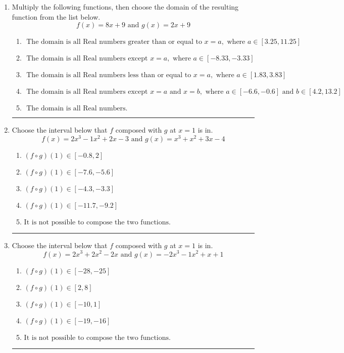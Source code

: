 \documentclass[14pt]{extbook}
\newcommand{\litem}[1]{\item#1\hspace*{-1cm}\rule{\textwidth}{0.4pt}}
\begin{document}
\begin{enumerate}
{\begin{enumerate}[label=\Alph*.]
\end{enumerate} }
\litem{
Multiply the following functions, then choose the domain of the resulting function from the list below.\[ f(x) = 8x + 9 \text{ and } g(x) = 2x + 9 \]\begin{enumerate}[label=\Alph*.]
\item \( \text{ The domain is all Real numbers greater than or equal to } x = a, \text{ where } a \in [3.25, 11.25] \)
\item \( \text{ The domain is all Real numbers except } x = a, \text{ where } a \in [-8.33, -3.33] \)
\item \( \text{ The domain is all Real numbers less than or equal to } x = a, \text{ where } a \in [1.83, 3.83] \)
\item \( \text{ The domain is all Real numbers except } x = a \text{ and } x = b, \text{ where } a \in [-6.6, -0.6] \text{ and } b \in [4.2, 13.2] \)
\item \( \text{ The domain is all Real numbers. } \)

\end{enumerate} }
\litem{
Choose the interval below that $f$ composed with $g$ at $x=1$ is in.\[ f(x) = 2x^{3} -1 x^{2} +2 x -3 \text{ and } g(x) = x^{3} + x^{2} +3 x -4 \]\begin{enumerate}[label=\Alph*.]
\item \( (f \circ g)(1) \in [-0.8, 2] \)
\item \( (f \circ g)(1) \in [-7.6, -5.6] \)
\item \( (f \circ g)(1) \in [-4.3, -3.3] \)
\item \( (f \circ g)(1) \in [-11.7, -9.2] \)
\item \( \text{It is not possible to compose the two functions.} \)

\end{enumerate} }
\litem{
Choose the interval below that $f$ composed with $g$ at $x=1$ is in.\[ f(x) = 2x^{3} +2 x^{2} -2 x \text{ and } g(x) = -2x^{3} -1 x^{2} +x + 1 \]\begin{enumerate}[label=\Alph*.]
\item \( (f \circ g)(1) \in [-28, -25] \)
\item \( (f \circ g)(1) \in [2, 8] \)
\item \( (f \circ g)(1) \in [-10, 1] \)
\item \( (f \circ g)(1) \in [-19, -16] \)
\item \( \text{It is not possible to compose the two functions.} \)

\end{enumerate} }
\end{enumerate}
\end{document}
